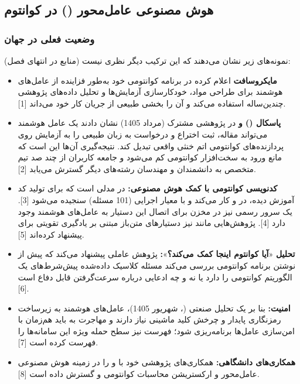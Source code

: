 \documentclass[a4paper,12pt]{article}
\begin{document}
	\subsection{هوش مصنوعی عامل‌محور () در کوانتوم}

	\subsubsection*{وضعیت فعلی در جهان}
	نمونه‌های زیر نشان می‌دهند که این ترکیب دیگر نظری نیست (منابع در انتهای فصل):
	\begin{itemize}[rightmargin=0.5cm, itemsep=4pt]
		\item \textbf{مایکروسافت} اعلام کرده در برنامه کوانتومی خود به‌طور فزاینده از عامل‌های هوشمند برای طراحی مواد، خودکارسازی آزمایش‌ها
		و تحلیل داده‌های پژوهشی چندین‌ساله استفاده می‌کند و آن را بخشی طبیعی از جریان کار خود می‌داند [1].
		\item \textbf{پاسکال () و } در پژوهشی مشترک (مرداد 1405) نشان دادند یک عامل هوشمند می‌تواند مقاله، ثبت اختراع
		و درخواست به زبان طبیعی را به آزمایش روی پردازنده‌های کوانتومی اتم خنثی واقعی تبدیل کند.
		نتیجه‌گیری آن‌ها این است که مانع ورود به سخت‌افزار کوانتومی کم می‌شود و جامعه کاربران از چند صد تیم متخصص به دانشمندان و مهندسان رشته‌های دیگر گسترش می‌یابد [2].
		\item \textbf{کدنویسی کوانتومی با کمک هوش مصنوعی:}  در  مدلی است که برای تولید کد  آموزش دیده، در  و
		 کار می‌کند و با معیار اجرایی  (101 مسئله) سنجیده می‌شود [3]. یک سرور  رسمی نیز در مخزن
		 برای اتصال این دستیار به عامل‌های هوشمند وجود دارد [4]. پژوهش‌هایی مانند  نیز دستیارهای متن‌باز مبتنی بر یادگیری تقویتی برای  پیشنهاد کرده‌اند [5].
		\item \textbf{تحلیل} «\textbf{آیا کوانتوم اینجا کمک می‌کند؟}»\textbf{:} پژوهش  عاملی پیشنهاد می‌کند که پیش از نوشتن برنامه کوانتومی بررسی می‌کند
		مسئله کلاسیک داده‌شده پیش‌شرط‌های یک الگوریتم کوانتومی را دارد یا نه و چه ادعایی درباره سرعت‌گرفتن قابل دفاع است [6].
		\item \textbf{امنیت:} بنا بر یک تحلیل صنعتی (، شهریور 1405)، عامل‌های هوشمند به زیرساخت رمزنگاری پایدار و چرخش کلید ماشینی نیاز دارند و
		مهاجرت به  باید هم‌زمان با امن‌سازی عامل‌ها برنامه‌ریزی شود؛ فهرست  نیز سطح حمله ویژه این سامانه‌ها را فهرست کرده است [7].
		\item \textbf{همکاری‌های دانشگاهی:}  همکاری‌های پژوهشی خود با  و  را در زمینه هوش مصنوعی عامل‌محور و ارکستریشن محاسبات کوانتومی و  گسترش داده است [8].
	\end{itemize}
\end{document}
